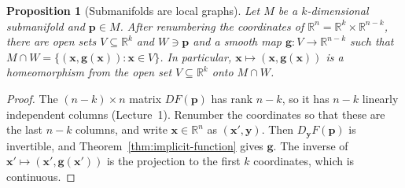 \documentclass[11pt]{article}
\theoremstyle{definition}
\theoremstyle{plain}
\newtheorem{proposition}[definition]{Proposition}
\theoremstyle{remark}
\begin{document}
\begin{proposition}[Submanifolds are local graphs]\label{prop:local-graph}
    Let $M$ be a $k$-dimensional submanifold and $\mathbf{p} \in M$. After renumbering the coordinates of $\mathbb{R}^n = \mathbb{R}^k \times \mathbb{R}^{n-k}$, there are open sets $V \subseteq \mathbb{R}^k$ and $W \ni \mathbf{p}$ and a smooth map $\mathbf{g}: V \to \mathbb{R}^{n-k}$ such that $M \cap W = \{(\mathbf{x}, \mathbf{g}(\mathbf{x})) : \mathbf{x} \in V\}$. In particular, $\mathbf{x} \mapsto (\mathbf{x}, \mathbf{g}(\mathbf{x}))$ is a homeomorphism from the open set $V \subseteq \mathbb{R}^k$ onto $M \cap W$.
\end{proposition}

\begin{proof}
    The $(n - k) \times n$ matrix $DF(\mathbf{p})$ has rank $n - k$, so it has $n - k$ linearly independent columns (Lecture~1). Renumber the coordinates so that these are the last $n - k$ columns, and write $\mathbf{x} \in \mathbb{R}^n$ as $(\mathbf{x}', \mathbf{y})$. Then $D_{\mathbf{y}}F(\mathbf{p})$ is invertible, and Theorem~\ref{thm:implicit-function} gives $\mathbf{g}$. The inverse of $\mathbf{x}' \mapsto (\mathbf{x}', \mathbf{g}(\mathbf{x}'))$ is the projection to the first $k$ coordinates, which is continuous.
\end{proof}
\end{document}

